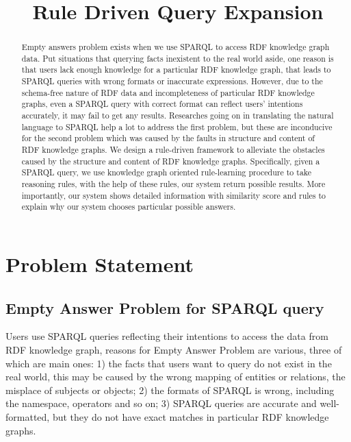 \documentclass[runningheads]{llncs}
\begin{document}
%
\title{Rule Driven Query Expansion}
%
%
%
%
%
\maketitle              %
%
\begin{abstract}
  Empty answers problem exists when we use SPARQL to access RDF knowledge graph data. Put situations that querying facts inexistent to the real world aside, one reason is that users lack enough knowledge for a particular RDF knowledge graph, that leads to SPARQL queries with wrong formats or inaccurate expressions.  However, due to the schema-free nature of RDF data and incompleteness of particular RDF knowledge graphs, even a SPARQL query with correct format can reflect users' intentions accurately, it may fail to get any results. Researches going on in translating the natural language to SPARQL help a lot to address the first problem, but these are inconducive for the second problem which was caused by the faults in structure and content of RDF knowledge graphs.
  We design a rule-driven framework to alleviate the obstacles caused by the structure and content of RDF knowledge graphs. Specifically, given a SPARQL query, we use knowledge graph oriented rule-learning procedure to take reasoning rules, with the help of these rules, our system return possible results. More importantly, our system shows detailed information with similarity score and rules to explain why our system chooses particular possible answers.
\end{abstract}
%
%
%
\section{Problem Statement}
\subsection{Empty Answer Problem for SPARQL query}
Users use SPARQL queries reflecting their intentions to access the  data from RDF knowledge graph, reasons for Empty Answer Problem are various, three of which are main ones: 1) the facts that users want to query do not exist in the real world, this may be caused by the wrong mapping of entities or relations, the misplace of subjects or objects; 2) the formats of SPARQL is wrong, including  the namespace, operators and so on; 3) SPARQL queries are accurate and well-formatted, but they do not have exact matches in particular RDF knowledge graphs.
\end{document}
